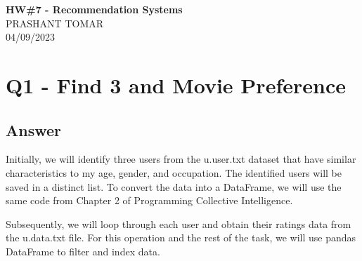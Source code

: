 \documentclass[12pt]{article}
\begin{document}
\begin{centering}
{\large\textbf{HW\#7 - Recommendation Systems }}\\ %
PRASHANT TOMAR\\                     %
04/09/2023\\                      %
\end{centering}


\section*{Q1 - Find 3 and Movie Preference}

\subsection*{Answer}
Initially, we will identify three users from the u.user.txt dataset that have similar characteristics to my age, gender, and occupation. The identified users will be saved in a distinct list. To convert the data into a DataFrame, we will use the same code from Chapter 2 of Programming Collective Intelligence.

Subsequently, we will loop through each user and obtain their ratings data from the u.data.txt file. For this operation and the rest of the task, we will use pandas DataFrame to filter and index data.
\end{document}
